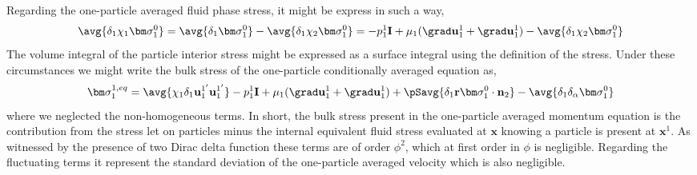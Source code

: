 Regarding the one-particle averaged fluid phase stress, it might be express in such a way, 
\begin{align*}
    \avg{\delta_1 \chi_1 \bm\sigma_1^0}
    = 
    \avg{\delta_1 \bm\sigma_1^0}
    - \avg{\delta_1 \chi_2 \bm\sigma_1^0}
    =
    - p_1^1 \textbf{I}
    +\mu_1  (\grad \textbf{u}_1^1+\grad \textbf{u}_1^1)
    - \avg{\delta_1 \chi_2 \bm\sigma_1^0}
\end{align*}
The volume integral of the particle interior stress might be expressed as a surface integral using the definition of the stress. 
Under these circumstances we might write the bulk stress of the one-particle conditionally averaged equation as, 
\begin{equation*}
    \bm\sigma_1^{1,eq}
    = \avg{\chi_1 \delta_1 \textbf{u}_1^{1'}\textbf{u}_1^{1'}}
    - p_1^1 \textbf{I}
    +\mu_1  (\grad \textbf{u}_1^1+\grad \textbf{u}_1^1)
    + \pSavg{\delta_1\textbf{r}\bm\sigma_1^0\cdot\textbf{n}_2}
    - \avg{\delta_1 \delta_\alpha \bm\sigma_1^0}
\end{equation*}
where we neglected the non-homogeneous terms. 
In short, the bulk stress present in the one-particle averaged momentum equation is the contribution from the stress let on particles minus the internal equivalent fluid stress evaluated at $\textbf{x}$ knowing a particle is present at $\textbf{x}^1$.
As witnessed by the presence of two Dirac delta function these terms are of order $\phi^2$, which at first order in $\phi$ is negligible.  
Regarding the fluctuating terms it represent the standard deviation of the one-particle averaged velocity which is also negligible. 

